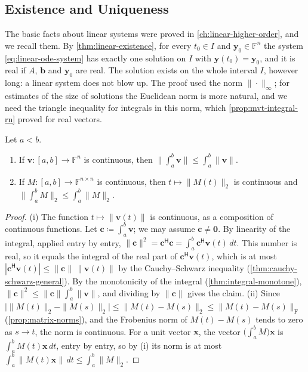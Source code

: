 \subsection{Existence and Uniqueness}

The basic facts about linear systems were proved in \cref{ch:linear-higher-order}, and we recall them. By \cref{thm:linear-existence}, for every $t_0\in I$ and $\mathbf y_0\in\mathbb F^n$ the system \eqref{eq:linear-ode-system} has exactly one solution on $I$ with $\mathbf y(t_0)=\mathbf y_0$, and it is real if $A$, $\mathbf b$ and $\mathbf y_0$ are real. The solution exists on the whole interval $I$, however long: a linear system does not blow up. The proof used the norm $\|\cdot\|_\infty$; for estimates of the size of solutions the Euclidean norm is more natural, and we need the triangle inequality for integrals in this norm, which \cref{prop:mvt-integral-rn} proved for real vectors.

\begin{lemma}
\label{lem:integral-norm}
Let $a<b$.
\begin{enumerate}
\item If $\mathbf v\colon[a,b]\to\mathbb F^n$ is continuous, then $\bigl\|\int_a^b\mathbf v\bigr\|\le\int_a^b\|\mathbf v\|$.
\item If $M\colon[a,b]\to\mathbb F^{n\times n}$ is continuous, then $t\mapsto\|M(t)\|_2$ is continuous and $\bigl\|\int_a^bM\bigr\|_2\le\int_a^b\|M\|_2$.
\end{enumerate}
\end{lemma}

\begin{proof}
(i) The function $t\mapsto\|\mathbf v(t)\|$ is continuous, as a composition of continuous functions. Let $\mathbf c\coloneqq\int_a^b\mathbf v$; we may assume $\mathbf c\ne\mathbf 0$. By linearity of the integral, applied entry by entry, $\|\mathbf c\|^2=\mathbf c^{\mathsf H}\mathbf c=\int_a^b\mathbf c^{\mathsf H}\mathbf v(t)\,dt$. This number is real, so it equals the integral of the real part of $\mathbf c^{\mathsf H}\mathbf v(t)$, which is at most $|\mathbf c^{\mathsf H}\mathbf v(t)|\le\|\mathbf c\|\,\|\mathbf v(t)\|$ by the Cauchy--Schwarz inequality (\cref{thm:cauchy-schwarz-general}). By the monotonicity of the integral (\cref{thm:integral-monotone}), $\|\mathbf c\|^2\le\|\mathbf c\|\int_a^b\|\mathbf v\|$, and dividing by $\|\mathbf c\|$ gives the claim. (ii) Since $\bigl|\|M(t)\|_2-\|M(s)\|_2\bigr|\le\|M(t)-M(s)\|_2\le\|M(t)-M(s)\|_{\mathrm F}$ (\cref{prop:matrix-norms}), and the Frobenius norm of $M(t)-M(s)$ tends to zero as $s\to t$, the norm is continuous. For a unit vector $\mathbf x$, the vector $\bigl(\int_a^bM\bigr)\mathbf x$ is $\int_a^bM(t)\mathbf x\,dt$, entry by entry, so by (i) its norm is at most $\int_a^b\|M(t)\mathbf x\|\,dt\le\int_a^b\|M\|_2$.
\end{proof}

